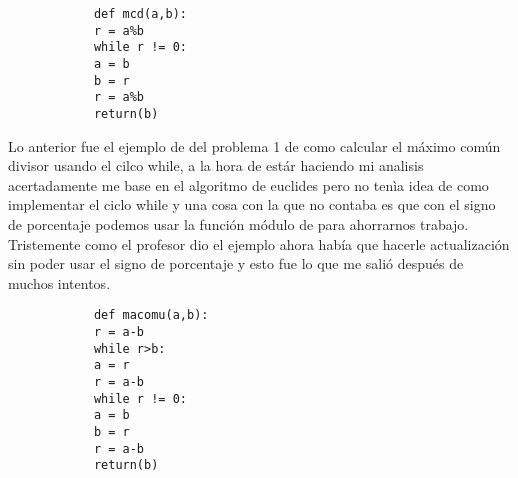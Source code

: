 \documentclass[letterpaper, 12pt, oneside]{article}
\begin{document}
\begin{enumerate}
\begin{enumerate}
\begin{verbatim}
			def mcd(a,b):
			r = a%b
			while r != 0:
			a = b
			b = r
			r = a%b
			return(b)
			\end{verbatim}
		
			
			Lo anterior fue el ejemplo de del problema 1 de como calcular el máximo común divisor usando el cilco while, a la hora de estár  haciendo mi analisis acertadamente me base en el algoritmo de euclides pero no tenìa idea de como implementar el ciclo while y una cosa con la que no contaba es que con el signo de porcentaje podemos usar la función módulo de para ahorrarnos trabajo. Tristemente como el profesor dio el ejemplo ahora había que hacerle actualización sin poder usar el signo de porcentaje y esto fue lo que me salió después de muchos intentos.
				
			\begin{verbatim}
			def macomu(a,b):
			r = a-b
			while r>b:
			a = r
			r = a-b
			while r != 0:
			a = b
			b = r
			r = a-b
			return(b)
			\end{verbatim}
		\end{enumerate}
	\end{enumerate}
\end{document}
